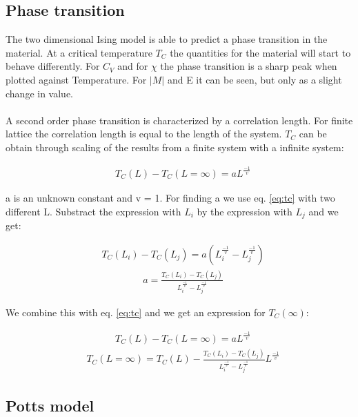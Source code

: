 \subsection{Phase transition}

The two dimensional Ising model is able to predict a phase transition in the material. At a critical temperature $T_C$ the quantities for the material will start to behave differently. For $C_V$ and for $\chi$ the phase transition is a sharp peak when plotted against Temperature. For $|M|$ and E it can be seen, but only as a slight change in value.
\\
\\
A second order phase transition is characterized by a correlation length. For finite lattice the correlation length is equal to the length of the system. $T_C$ can be obtain through scaling of the results from a finite system with a infinite system:

\begin{align}
    &T_C (L) - T_C (L=\infty) = a L^{\frac{-1}{v}}
    \label{eq:tc}
\end{align}

a is an unknown constant and v = 1. For finding a we use eq. \ref{eq:tc} with two different L. Substract the expression with $L_i$ by the expression with $L_j$ and we get:

\begin{align*}
    &T_C (L_i) - T_C (L_j) = a
    \left(
    L_i^{\frac{-1}{v}}-L_j^{\frac{-1}{v}}
    \right)
\end{align*}
\begin{align}
    &a =
    \frac{T_C (L_i) - T_C (L_j)}
    {
    L_i^{\frac{-1}{v}}-L_j^{\frac{-1}{v}}
    } \label{eq:find-a}
\end{align}

We combine this with eq. \ref{eq:tc} and we get an expression for $T_C(\infty)$:

\begin{align*}
    &T_C (L) - T_C (L=\infty) = a L^{\frac{-1}{v}}
\end{align*}
\begin{align}
    &T_C (L=\infty) = T_C (L) -
    \frac
    {
    T_C (L_i) - T_C (L_j)
    }
    {
    L_i^{\frac{-1}{v}}-L_j^{\frac{-1}{v}}
    }
     L^{\frac{-1}{v}}
    \label{eq:t-c}
\end{align}



\subsection{Potts model}






